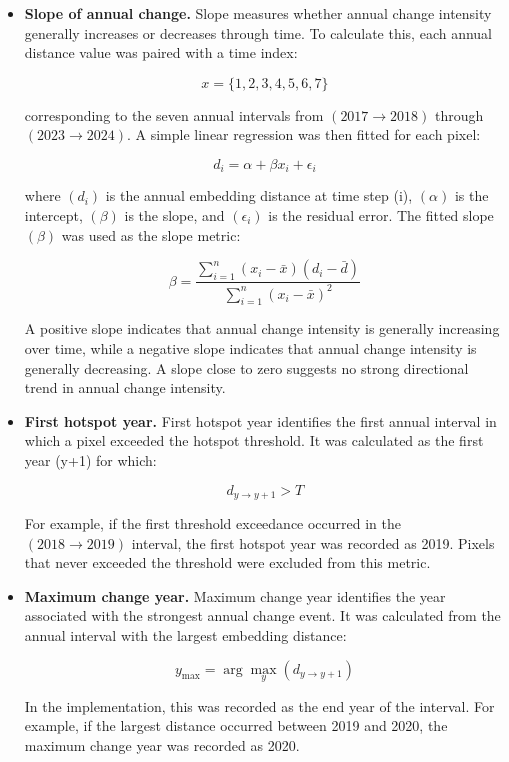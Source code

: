 \documentclass[11pt,a4paper]{article}
\begin{document}
\begin{itemize}[leftmargin=*]
    \[\sigma^2 =
    \frac{1}{n-1}
    \sum_{i=1}^{n}
    (d_i-\bar{d})^2\]

    where (n=7) in the current annual sequence. High variance indicates that annual change is unstable or intermittent, with some years changing much more strongly than others. Low variance suggests a more consistent temporal pattern.

    \item \textbf{Slope of annual change.} Slope measures whether annual change intensity generally increases or decreases through time. To calculate this, each annual distance value was paired with a time index:

    \[x = \{1,2,3,4,5,6,7\}\]

    corresponding to the seven annual intervals from $(2017\rightarrow2018)$ through $(2023\rightarrow2024)$. A simple linear regression was then fitted for each pixel:

    \[d_i = \alpha + \beta x_i + \epsilon_i\]

    where $(d_i)$ is the annual embedding distance at time step (i), $(\alpha)$ is the intercept, $(\beta)$ is the slope, and $(\epsilon_i)$ is the residual error. The fitted slope $(\beta)$ was used as the slope metric:

    \[
    \beta =
    \frac{
    \sum_{i=1}^{n}
    (x_i-\bar{x})(d_i-\bar{d})
    }{
    \sum_{i=1}^{n}
    (x_i-\bar{x})^2
    }
    \]

    A positive slope indicates that annual change intensity is generally increasing over time, while a negative slope indicates that annual change intensity is generally decreasing. A slope close to zero suggests no strong directional trend in annual change intensity.

    \item \textbf{First hotspot year.} First hotspot year identifies the first annual interval in which a pixel exceeded the hotspot threshold. It was calculated as the first year (y+1) for which:

    \[d_{y \rightarrow y+1} > T\]

    For example, if the first threshold exceedance occurred in the $(2018\rightarrow2019)$ interval, the first hotspot year was recorded as 2019. Pixels that never exceeded the threshold were excluded from this metric.

    \item \textbf{Maximum change year.} Maximum change year identifies the year associated with the strongest annual change event. It was calculated from the annual interval with the largest embedding distance:

    \[
    y_{\max}
    =
    \arg\max_{y}
    \left(
    d_{y \rightarrow y+1}
    \right)
    \]

    In the implementation, this was recorded as the end year of the interval. For example, if the largest distance occurred between 2019 and 2020, the maximum change year was recorded as 2020.

\end{itemize}
\end{document}
